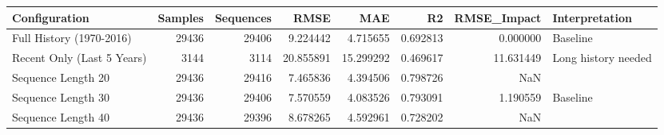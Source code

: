 \begin{tabular}{lrrrrrrl}
\toprule
Configuration & Samples & Sequences & RMSE & MAE & R2 & RMSE_Impact & Interpretation \\
\midrule
Full History (1970-2016) & 29436 & 29406 & 9.224442 & 4.715655 & 0.692813 & 0.000000 & Baseline \\
Recent Only (Last 5 Years) & 3144 & 3114 & 20.855891 & 15.299292 & 0.469617 & 11.631449 & Long history needed \\
Sequence Length 20 & 29436 & 29416 & 7.465836 & 4.394506 & 0.798726 & NaN &  \\
Sequence Length 30 & 29436 & 29406 & 7.570559 & 4.083526 & 0.793091 & 1.190559 & Baseline \\
Sequence Length 40 & 29436 & 29396 & 8.678265 & 4.592961 & 0.728202 & NaN &  \\
\bottomrule
\end{tabular}
